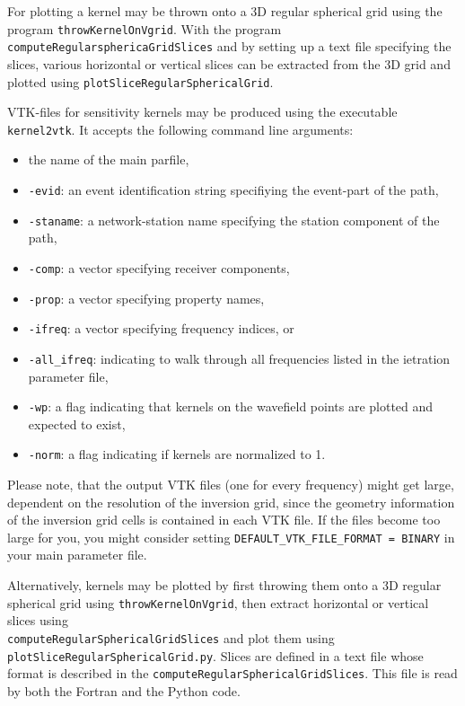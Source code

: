 For plotting a kernel may be thrown onto a 3D regular spherical grid using the program \verb+throwKernelOnVgrid+. With the program \verb+computeRegularsphericaGridSlices+ and by setting up a text file specifying the slices, various horizontal or vertical slices can be extracted from the 3D grid and plotted using \verb+plotSliceRegularSphericalGrid+.

 VTK-files for sensitivity kernels may be produced using the executable \verb+kernel2vtk+. It accepts the following command line arguments:
 \begin{itemize}
	\setlength{\itemsep}{-0.1cm}
   \item the name of the main parfile,
   \item \verb+-evid+: an event identification string specifiying the event-part of the path,
   \item \verb+-staname+: a network-station name specifying the station component of the path,
	\item \verb+-comp+: a vector specifying receiver components,
	\item \verb+-prop+: a vector specifying property names,
	\item \verb+-ifreq+: a vector specifying frequency indices, or
	\item \verb+-all_ifreq+: indicating to walk through all frequencies listed in the ietration parameter file,
   \item \verb+-wp+: a flag indicating that kernels on the wavefield points are plotted and expected to exist,
	\item \verb+-norm+: a flag indicating if kernels are normalized to 1.
 \end{itemize}

Please note, that the output VTK files (one for every frequency) might get large, dependent on the resolution of the inversion grid, since the geometry information of the inversion grid cells is contained in each VTK file. If the files become too large for you, you might consider setting \verb+DEFAULT_VTK_FILE_FORMAT = BINARY+ in your main parameter file.

Alternatively, kernels may be plotted by first throwing them onto a 3D regular spherical grid using \verb+throwKernelOnVgrid+, then extract horizontal or vertical slices using \\
\verb+computeRegularSphericalGridSlices+ and plot them using \\
\verb+plotSliceRegularSphericalGrid.py+. Slices are defined in a text file whose format is described in the \verb+computeRegularSphericalGridSlices+. This file is read by both the Fortran and the Python code.
%
